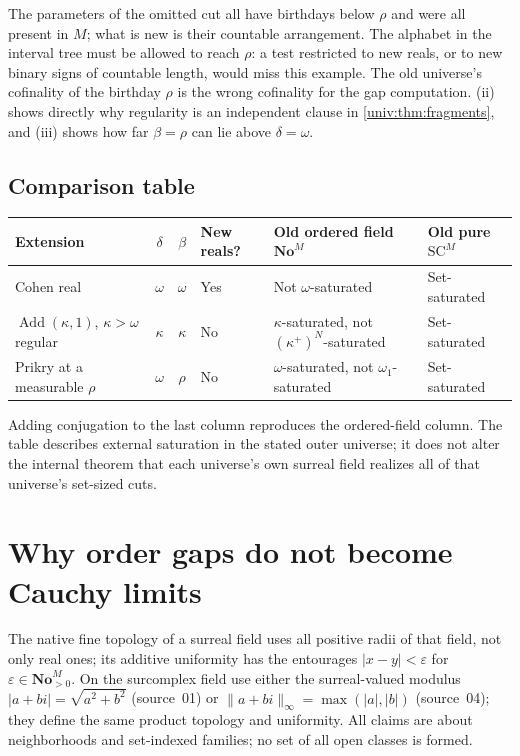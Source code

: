 \documentclass[11pt,letterpaper]{article}
\numberwithin{equation}{section}
\theoremstyle{definition}
\theoremstyle{remark}
\newcommand{\No}{\mathbf{No}}
\newcommand{\SC}{\mathrm{SC}}
\newcommand{\NoM}{\No^{M}}
\newcommand{\SCM}{\SC^{M}}
\newcommand{\Add}{\operatorname{Add}}
\newcommand{\abs}[1]{\lvert#1\rvert}
\begin{document}
The parameters of the omitted cut all have birthdays below $\rho$ and were all
present in $M$; what is new is their countable arrangement. The alphabet in the
interval tree must be allowed to reach $\rho$: a test restricted to new reals,
or to new binary signs of countable length, would miss this example. The old
universe's cofinality of the birthday $\rho$ is the wrong cofinality for the
gap computation. (ii) shows directly why regularity is an
independent clause in \cref{univ:thm:fragments}, and (iii) shows how far
$\beta=\rho$ can lie above $\delta=\omega$.

\subsection{Comparison table}

\begin{center}\small
\begin{tabular}{@{}P{0.25\textwidth}ccP{0.11\textwidth}P{0.22\textwidth}P{0.14\textwidth}@{}}
\toprule
Extension & $\delta$ & $\beta$ & New reals? & Old ordered field $\NoM$ & Old pure $\SCM$\\
\midrule
Cohen real & $\omega$ & $\omega$ & Yes & Not $\omega$-saturated & Set-saturated\\[3pt]
$\Add(\kappa,1)$, $\kappa>\omega$ regular & $\kappa$ & $\kappa$ & No & $\kappa$-saturated, not $(\kappa^+)^N$-saturated & Set-saturated\\[3pt]
Prikry at a measurable $\rho$ & $\omega$ & $\rho$ & No & $\omega$-saturated, not $\omega_1$-saturated & Set-saturated\\
\bottomrule
\end{tabular}
\end{center}
Adding conjugation to the last column reproduces the ordered-field column. The
table describes external saturation in the stated outer universe; it does not
alter the internal theorem that each universe's own surreal field realizes all
of that universe's set-sized cuts.

\section{Why order gaps do not become Cauchy limits}\label{univ:sec:topology}

The native fine topology of a surreal field uses all positive radii of that
field, not only real ones; its additive uniformity has the entourages
$\abs{x-y}<\varepsilon$ for $\varepsilon\in\NoM_{>0}$. On the surcomplex field
use either the surreal-valued modulus $\abs{a+bi}=\sqrt{a^2+b^2}$ (source~01)
or $\|a+bi\|_\infty=\max(\abs a,\abs b)$ (source~04); they define the same
product topology and uniformity. All claims are about neighborhoods and
set-indexed families; no set of all open classes is formed.
\end{document}
